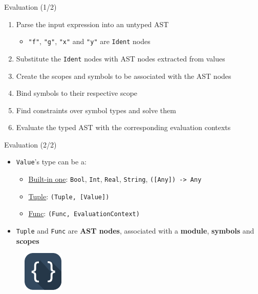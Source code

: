 \documentclass[10pt]{beamer}
\begin{document}
\begin{frame}[fragile]{Evaluation (1/2)}
    \begin{enumerate}
        \setlength\itemsep{1.15em}
        \item Parse the input expression into an untyped AST\vspace{\topsep}\begin{itemize}
            \setlength\itemsep{0.45em}
            \item \texttt{"f"}, \texttt{"g"}, \texttt{"x"} and \texttt{"y"} are \texttt{Ident} nodes
        \end{itemize}
      \item Substitute the \texttt{Ident} nodes with AST nodes extracted from values
      \item Create the scopes and symbols to be associated with the AST nodes
      \item Bind symbols to their respective scope
      \item Find constraints over symbol types and solve them
      \item Evaluate the typed AST with the corresponding evaluation contexts
    \end{enumerate}
\end{frame}

\begin{frame}[fragile]{Evaluation (2/2)}
    \begin{itemize}
        \setlength\itemsep{1.15em}
        \item \texttt{Value}'s type can be a:\vspace{\topsep}\begin{itemize}
            \setlength\itemsep{0.45em}
            \item \underline{Built-in one}: \texttt{Bool}, \texttt{Int}, \texttt{Real}, \texttt{String}, \texttt{([Any]) -> Any}
            \item \underline{Tuple}: \texttt{(Tuple, [Value])}
            \item \underline{Func}: \texttt{(Func, EvaluationContext)}
        \end{itemize}
      \item \texttt{Tuple} and \texttt{Func} are \textbf{AST nodes}, associated with a \textbf{module}, \textbf{symbols} and \textbf{scopes}
    \end{itemize}
    \begin{figure}
        \centering
        \includegraphics[width=0.17\textwidth]{04scope.png}
    \end{figure}
\end{frame}
\end{document}
